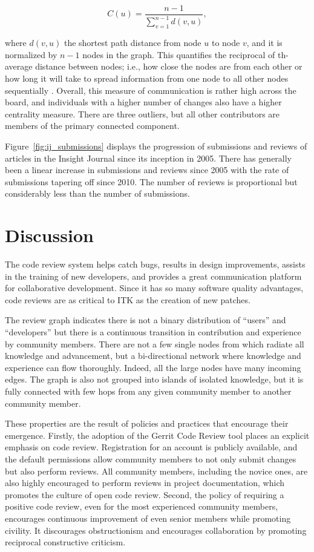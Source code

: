 \documentclass{frontiersENG} %
\begin{document}
\begin{equation}
   C(u) = \frac{n - 1}{\sum_{v=1}^{n-1} d(v, u)},
\end{equation}

where $d(v, u)$ the shortest path distance from node $u$ to node $v$, and it
is normalized by $n-1$ nodes in the graph. This quantifies the reciprocal of th-
average distance between nodes; i.e., how close the nodes are from each other
or how long it will take to spread information from one node to all other
nodes sequentially \cite{Newman2005}. Overall, this measure of communication is
rather high across the board, and individuals with a higher
number of changes also have a higher centrality measure.  There are three
outliers, but all other contributors are members of the primary connected
component.

Figure~\ref{fig:ij_submissions} displays the progression of submissions and
reviews of articles in the Insight Journal since its inception in 2005.  There
has generally been a linear increase in submissions and reviews since 2005
with the rate of submissions tapering off since 2010.  The number of reviews
is proportional but considerably less than the number of submissions.




\section{Discussion}

The code review system helps catch bugs, results in design improvements,
assists in the training of new developers, and provides a great communication
platform for collaborative development. Since it has so many software quality
advantages, code reviews are as critical to ITK as the creation of new patches.

The review graph indicates there is not a binary distribution of ``users'' and
``developers'' but there is a continuous transition in contribution and experience
by community members. There are not a few single nodes from which radiate all
knowledge and advancement, but a bi-directional network where knowledge and
experience can flow thoroughly.  Indeed, all the large nodes have many
incoming edges. The graph is also not grouped into islands of
isolated knowledge, but it is fully connected with few hops from any given
community member to another community member.

These properties are the result of policies and practices that encourage their
emergence. Firstly, the adoption of the Gerrit Code Review tool places an
explicit emphasis on code review.  Registration for an account is publicly
available, and the default permissions allow community
members to not only submit changes but also perform reviews. All community
members, including the novice ones, are also highly encouraged to perform
reviews in project documentation, which promotes the culture of open code
review. Second, the policy of requiring a positive code review, even for the
most experienced community members, encourages continuous improvement of even
senior members while promoting civility. It discourages obstructionism and
encourages collaboration by promoting reciprocal constructive criticism.
\end{document}
